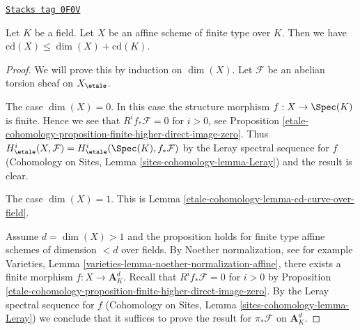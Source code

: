 \begin{proposition}[Cd affine]
\label{etale-cohomology-proposition-cd-affine}
\href{https://stacks.math.columbia.edu/tag/0F0V}{\texttt{Stacks tag 0F0V}}

Let $K$ be a field. Let $X$ be an affine scheme of finite type over $K$.
Then we have $\text{cd}(X) \leq \dim(X) + \text{cd}(K)$.
\end{proposition}

\begin{proof}
We will prove this by induction on $\dim(X)$.
Let $\mathcal{F}$ be an abelian torsion sheaf on $X_\etale$.

\medskip\noindent
The case $\dim(X) = 0$. In this case the structure morphism
$f : X \to \Spec(K)$ is finite. Hence we see that $R^if_*\mathcal{F} = 0$
for $i > 0$, see Proposition \ref{etale-cohomology-proposition-finite-higher-direct-image-zero}.
Thus $H^i_\etale(X, \mathcal{F}) = H^i_\etale(\Spec(K), f_*\mathcal{F})$
by the Leray spectral sequence for $f$
(Cohomology on Sites, Lemma \ref{sites-cohomology-lemma-Leray})
and the result is clear.

\medskip\noindent
The case $\dim(X) = 1$. This is Lemma \ref{etale-cohomology-lemma-cd-curve-over-field}.

\medskip\noindent
Assume $d = \dim(X) > 1$ and the proposition holds for finite type
affine schemes of dimension $< d$ over fields.
By Noether normalization, see for example
Varieties, Lemma \ref{varieties-lemma-noether-normalization-affine},
there exists a finite morphism $f : X \to \mathbf{A}^d_K$.
Recall that $R^if_*\mathcal{F} = 0$ for $i > 0$ by
Proposition \ref{etale-cohomology-proposition-finite-higher-direct-image-zero}.
By the Leray spectral sequence for $f$
(Cohomology on Sites, Lemma \ref{sites-cohomology-lemma-Leray})
we conclude that it suffices to prove the result for $\pi_*\mathcal{F}$
on $\mathbf{A}^d_K$.


\end{proof}

